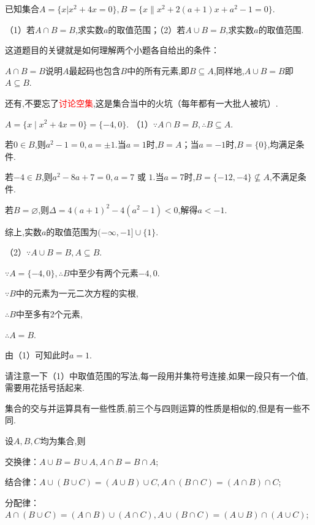 \documentclass[lang=cn,math=cm,chinesefont=nofont,11pt,scheme=chinese,twocol]{elegantbook}
\begin{document}
\begin{example}
  已知集合$A=\{x|x^{2}+4x=0\},B=\{x\|x^{2}+2(a+1)x+a^{2}-1=0\}.$

  （1）若$A\cap B=B$,求实数$a$的取值范围；（2）若$A\cup B=B$,求实数$a$的取值范围.
\end{example}
\begin{remark}
  这道题目的关键就是如何理解两个小题各自给出的条件：

  $A\cap B=B$说明$A$最起码也包含$B$中的所有元素,即$B\subseteq A$,同样地,$A\cup B=B$即$A\subseteq B$.

  还有,不要忘了\textcolor{red}{讨论空集},这是集合当中的火坑（每年都有一大批人被坑）.
\end{remark}
\begin{solution}
  $A=\{x\mid x^{2}+4x=0\}=\{-4,0\}.$
  （1）$\because A\cap B=B,$\enspace$\therefore B\subseteq A.$
  
  若$0\in B$,则$a^2-1=0,a=\pm 1.$当$a=1$时,$B=A$；当$a=-1$时,$B=\{0\}$,均满足条件.

  若$-4\in B$,则$a^2-8a+7=0,a=7\text{ 或 }1.$当$a=7$时,$B=\{-12,-4\}\nsubseteq A$,不满足条件.

  若$B=\varnothing$,则$\Delta=4(a+1)^{2}-4(a^{2}-1)<0$,解得$a<-1$.

  综上,实数$a$的取值范围为$(-\infty,-1]\cup\{1\}.$

  （2）$\because A\cup B=B,$\enspace$A\subseteq B.$

  $\because A=\{-4,0\},$\enspace$\therefore B$中至少有两个元素$-4,0.$

  $\because B$中的元素为一元二次方程的实根,

  $\therefore B$中至多有2个元素,

  $\therefore A=B.$

  由（1）可知此时$a=1$.
\end{solution}
\begin{remark}
  请注意一下（1）中取值范围的写法,每一段用并集符号连接,如果一段只有一个值,需要用花括号括起来.
\end{remark}

\hspace*{\fill}

集合的交与并运算具有一些性质,前三个与四则运算的性质是相似的,但是有一些不同.

设$A,B,C$均为集合,则
\begin{property}
  交换律：$A\cup B=B\cup A,A\cap B=B\cap A$;
\end{property}
\begin{property}
  结合律：$A\cup(B\cup C)=(A\cup B)\cup C,A\cap(B\cap C)=(A\cap B)\cap C$;
\end{property}
\begin{property}
  分配律：$A\cap(B\cup C)=(A\cap B)\cup(A\cap C),A\cup(B\cap C)=(A\cup B)\cap(A\cup C)$;
\end{property}
\end{document}
